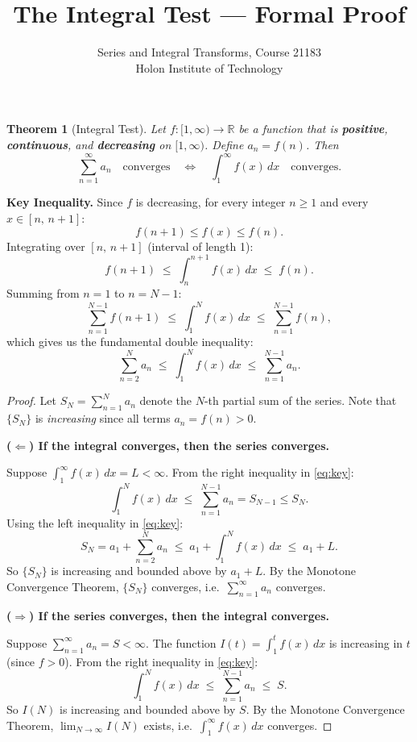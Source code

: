 \documentclass[12pt]{article}
\title{\textbf{The Integral Test --- Formal Proof}}
\author{Series and Integral Transforms, Course 21183\\Holon Institute of Technology}
\date{}
\newtheorem{theorem}{Theorem}
\begin{document}
\maketitle

\begin{theorem}[Integral Test]
Let $f:[1,\infty)\to\mathbb{R}$ be a function that is \textbf{positive}, \textbf{continuous},
and \textbf{decreasing} on $[1,\infty)$. Define $a_n = f(n)$. Then
\[
    \sum_{n=1}^{\infty} a_n \quad \text{converges} \quad \iff \quad \int_1^{\infty} f(x)\,dx \quad \text{converges.}
\]
\end{theorem}

\bigskip
\noindent\textbf{Key Inequality.}
Since $f$ is decreasing, for every integer $n \geq 1$ and every $x \in [n,\, n+1]$:
\[
    f(n+1) \leq f(x) \leq f(n).
\]
Integrating over $[n,\, n+1]$ (interval of length 1):
\[
    f(n+1) \;\leq\; \int_n^{n+1} f(x)\,dx \;\leq\; f(n).
\]
Summing from $n = 1$ to $n = N-1$:
\[
    \sum_{n=1}^{N-1} f(n+1)
    \;\leq\; \int_1^N f(x)\,dx
    \;\leq\; \sum_{n=1}^{N-1} f(n),
\]
which gives us the fundamental double inequality:
\begin{equation}\label{eq:key}
    \sum_{n=2}^{N} a_n
    \;\leq\; \int_1^N f(x)\,dx
    \;\leq\; \sum_{n=1}^{N-1} a_n.
\end{equation}

\bigskip
\begin{proof}
Let $S_N = \sum_{n=1}^N a_n$ denote the $N$-th partial sum of the series.
Note that $\{S_N\}$ is \emph{increasing} since all terms $a_n = f(n) > 0$.

\medskip
\noindent\textbf{($\Leftarrow$) If the integral converges, then the series converges.}

Suppose $\int_1^{\infty} f(x)\,dx = L < \infty$. From the right inequality in \eqref{eq:key}:
\[
    \int_1^N f(x)\,dx \;\leq\; \sum_{n=1}^{N-1} a_n = S_{N-1} \leq S_N.
\]
Using the left inequality in \eqref{eq:key}:
\[
    S_N = a_1 + \sum_{n=2}^{N} a_n
        \;\leq\; a_1 + \int_1^N f(x)\,dx
        \;\leq\; a_1 + L.
\]
So $\{S_N\}$ is increasing and bounded above by $a_1 + L$.
By the Monotone Convergence Theorem, $\{S_N\}$ converges, i.e.\ $\sum_{n=1}^{\infty} a_n$ converges.

\medskip
\noindent\textbf{($\Rightarrow$) If the series converges, then the integral converges.}

Suppose $\sum_{n=1}^{\infty} a_n = S < \infty$.
The function $I(t) = \int_1^t f(x)\,dx$ is increasing in $t$ (since $f > 0$).
From the right inequality in \eqref{eq:key}:
\[
    \int_1^N f(x)\,dx \;\leq\; \sum_{n=1}^{N-1} a_n \;\leq\; S.
\]
So $I(N)$ is increasing and bounded above by $S$.
By the Monotone Convergence Theorem, $\lim_{N\to\infty} I(N)$ exists,
i.e.\ $\int_1^{\infty} f(x)\,dx$ converges.
\end{proof}
\end{document}
